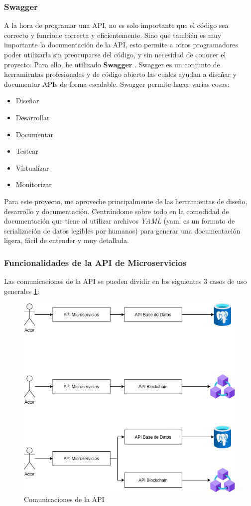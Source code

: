\subsubsection{Swagger}
A la hora de programar una API, no es solo importante que el código sea correcto y funcione correcta y eficientemente. Sino que también es muy importante la documentación de la API, esto permite a otros programadores poder utilizarla sin preocuparse del código, y sin necesidad de conocer el proyecto. Para ello, he utilizado \textbf{Swagger} \cite{swagger}. Swagger es un conjunto de herramientas profesionales y de código abierto las cuales ayudan a diseñar y documentar APIs de forma escalable. Swagger permite hacer varias cosas:
\begin{itemize}
\item Diseñar
\item Desarrollar
\item Documentar
\item Testear
\item Virtualizar
\item Monitorizar
\end{itemize}

Para este proyecto, me aproveche principalmente de las herramientas de diseño, desarrollo y documentación. Centrándome sobre todo en la comodidad de documentación que tiene al utilizar archivos \emph{YAML} (yaml es un formato de serialización de datos legibles por humanos) para generar una documentación ligera, fácil de entender y muy detallada. 

\subsubsection{Funcionalidades de la API de Microservicios}
Las comunicaciones de la API se pueden dividir en los siguientes 3 casos de uso generales \ref{fig:casosUso}:

\begin{figure}[h!]
  \centering
  \includegraphics[width=0.6\linewidth]{figs/Desarrollo/UML}
  \caption[Comunicaciones de la API]{Comunicaciones de la API}
  \label{fig:casosUso}
\end{figure}

